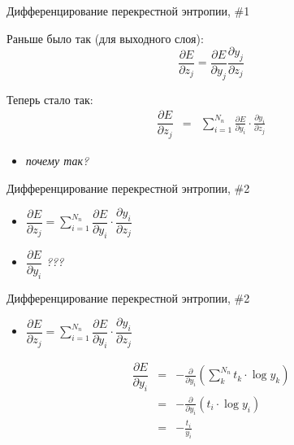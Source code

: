 \documentclass[10pt]{beamer}
\begin{document}
\begin{frame}{Дифференцирование перекрестной энтропии, \#1}

Раньше было так (для выходного слоя):
\begin{equation*}
	\dfrac{\partial E}{\partial z_j} = \dfrac{\partial E}{\partial y_j} \dfrac{\partial y_j}{\partial z_j}
\end{equation*}

Теперь стало так:
\begin{eqnarray*}
\dfrac{\partial E}{\partial z_j} &=& \sum_{i = 1}^{N_{n}} \frac{\partial E}{\partial y_i} \cdot \frac{\partial y_i}{\partial z_j}
\end{eqnarray*}

\begin{itemize}
	\item \textit{почему так?}
\end{itemize}

\end{frame}


\begin{frame}{Дифференцирование перекрестной энтропии, \#2}

\begin{itemize}
	\item $\dfrac{\partial E}{\partial z_j} = \sum_{i = 1}^{N_{n}} \dfrac{\partial E}{\partial y_i} \cdot \dfrac{\partial y_i}{\partial z_j}$
	\item $\dfrac{\partial E}{\partial y_i}$ \textit{???}
\end{itemize}

\end{frame}


\begin{frame}{Дифференцирование перекрестной энтропии, \#2}

\begin{itemize}
	\item $\dfrac{\partial E}{\partial z_j} = \sum_{i = 1}^{N_{n}} \dfrac{\partial E}{\partial y_i} \cdot \dfrac{\partial y_i}{\partial z_j}$
\end{itemize}

\begin{eqnarray*}
\dfrac{\partial E}{\partial y_i} &=& -\frac{\partial}{\partial y_i} \left( \sum_k^{N_n} t_k\cdot \log y_k \right) \\
&=& -\frac{\partial}{\partial y_i} \left( t_i\cdot \log y_i \right) \\
&=& -\frac{t_i}{y_i}
\end{eqnarray*}

\end{frame}
\end{document}
